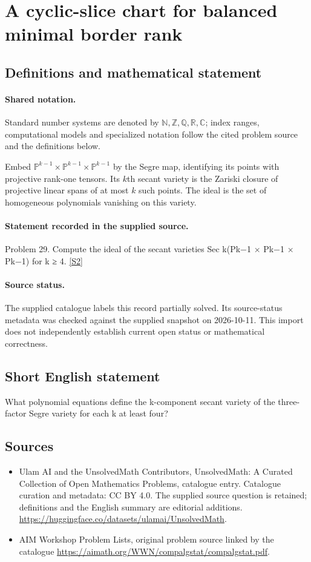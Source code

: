 \documentclass[11pt]{article}
\newcommand{\sref}[2]{\hyperlink{source:#1:#2}{[S#2]}}
\begin{document}
\section{A cyclic-slice chart for balanced minimal border rank}\label{statement}

\subsection{Definitions and mathematical statement}

\paragraph{Shared notation.}Standard number systems are denoted by $\mathbb N,\mathbb Z,\mathbb Q,\mathbb R,\mathbb C$; index ranges, computational models and specialized notation follow the cited problem source and the definitions below.


Embed $\mathbb P^{k-1}\times\mathbb P^{k-1}\times\mathbb P^{k-1}$ by the Segre map, identifying its points with projective rank-one tensors. Its $k$th secant variety is the Zariski closure of projective linear spans of at most $k$ such points. The ideal is the set of homogeneous polynomials vanishing on this variety.
\paragraph{Statement recorded in the supplied source.}
Problem 29. Compute the ideal of the secant varieties Sec k(Pk−1 × Pk−1 × Pk−1) for k ≥ 4. \sref{statement}{2}
\paragraph{Source status.}
The supplied catalogue labels this record partially solved. Its source-status metadata was checked against the supplied snapshot on 2026-10-11. This import does not independently establish current open status or mathematical correctness.
\subsection{Short English statement}
What polynomial equations define the k-component secant variety of the three-factor Segre variety for each k at least four?
\subsection{Sources}
\begin{itemize}
\item[\hypertarget{source:statement:1}{S1}] Ulam AI and the UnsolvedMath Contributors, UnsolvedMath: A Curated Collection of Open Mathematics Problems, catalogue entry. Catalogue curation and metadata: CC BY 4.0. The supplied source question is retained; definitions and the English summary are editorial additions.
\url{https://huggingface.co/datasets/ulamai/UnsolvedMath}.
\item[\hypertarget{source:statement:2}{S2}] AIM Workshop Problem Lists, original problem source linked by the catalogue
\url{https://aimath.org/WWN/compalgstat/compalgstat.pdf}.
\end{itemize}
\end{document}
